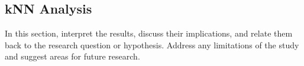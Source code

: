 \subsection{kNN Analysis} %
\label{subsec:discussion-knn}

In this section, interpret the results, discuss their implications, and relate them back to the research question or hypothesis. Address any limitations of the study and suggest areas for future research.


